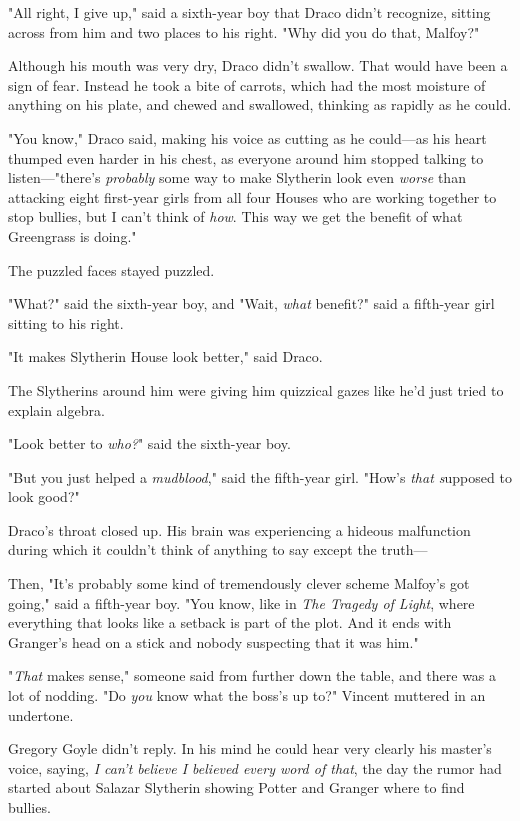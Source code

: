 "All right, I give up," said a sixth-year boy that Draco didn't recognize,
sitting across from him and two places to his right. "Why did you do that,
Malfoy?"

Although his mouth was very dry, Draco didn't swallow. That would have been a
sign of fear. Instead he took a bite of carrots, which had the most moisture of
anything on his plate, and chewed and swallowed, thinking as rapidly as he
could.

"You know," Draco said, making his voice as cutting as he could—as his heart
thumped even harder in his chest, as everyone around him stopped talking to
listen—"there's \emph{probably} some way to make Slytherin look even
\emph{worse} than attacking eight first-year girls from all four Houses who are
working together to stop bullies, but I can't think of \emph{how}. This way we
get the benefit of what Greengrass is doing."

The puzzled faces stayed puzzled.

"What?" said the sixth-year boy, and "Wait, \emph{what} benefit?" said a
fifth-year girl sitting to his right.

"It makes Slytherin House look better," said Draco.

The Slytherins around him were giving him quizzical gazes like he'd just tried
to explain algebra.

"Look better to \emph{who?}" said the sixth-year boy.

"But you just helped a \emph{mudblood}," said the fifth-year girl. "How's
\emph{that s}upposed to look good?"

Draco's throat closed up. His brain was experiencing a hideous malfunction
during which it couldn't think of anything to say except the truth—

Then, "It's probably some kind of tremendously clever scheme Malfoy's got
going," said a fifth-year boy. "You know, like in \emph{The Tragedy of Light},
where everything that looks like a setback is part of the plot. And it ends
with Granger's head on a stick and nobody suspecting that it was him."

"\emph{That} makes sense," someone said from further down the table, and there
was a lot of nodding.
\sbreak
"Do \emph{you} know what the boss's up to?" Vincent muttered in an undertone.

Gregory Goyle didn't reply. In his mind he could hear very clearly his master's
voice, saying, \emph{I can't believe I believed every word of that}, the day
the rumor had started about Salazar Slytherin showing Potter and Granger where
to find bullies.

